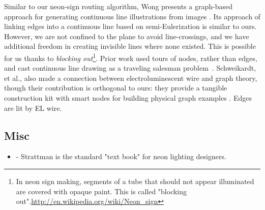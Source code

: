Similar to our neon-sign routing algorithm, Wong presents a graph-based approach for generating continuous line illustrations from images \cite{Wong-continuousline}. Its approach of linking edges into a continuous line based on semi-Eulerization is similar to ours.  However, we are not confined to the plane to avoid line-crossings, and we have additional freedom in creating invisible lines where none existed.  This is possible for us thanks to \emph{blocking out}\footnote{In neon sign making, segments of a tube that should not appear illuminated are covered with opaque paint. This is called "blocking out".\url{http://en.wikipedia.org/wiki/Neon_sign}}. Prior work used tours of nodes, rather than edges, and cast continuous line drawing as a traveling salesman problem~\cite{Bosch-tsp}.  Schweikardt, et al., also made a connection between electroluminescent wire and graph theory, though their contribution is orthogonal to ours: they provide a tangible construction kit with smart nodes for building physical graph examples \cite{Schweikardt-tei09}. Edges are lit by EL wire.

\subsection{Misc}
\begin{itemize}
\item \cite{strattman1997neon} - Strattman is the standard "text book" for neon lighting designers.
\end{itemize}